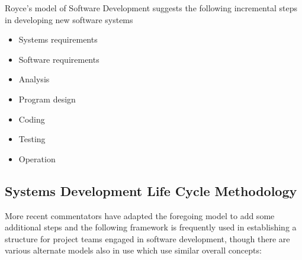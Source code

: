 \documentclass[a4paper,12pt]{article}
\begin{document}
\begin{samepage}
\begin{samepage}
Royce's model of Software Development suggests the following incremental steps in developing new software systems
\begin{itemize}
\item Systems requirements
\item Software requirements
\item Analysis
\item Program design
\item Coding
\item Testing
\item Operation
\end{itemize}
\subsection {Systems Development Life Cycle Methodology}
More recent commentators have adapted the foregoing model to add some additional steps and the following framework is frequently used in establishing a structure for project teams engaged in software development, though there are various alternate models also in use which use  similar overall concepts:


\end{samepage}
\end{samepage}
\end{document}
